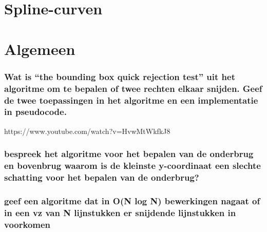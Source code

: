 \documentclass[12pt,a4paper]{article}
\begin{document}
\part{Spline-curven}
\iffalse
\section{Bewijs de eenheidspartitieeigenschap van genormaliseerde B-splines.}
\section{Hoe kan men bij splinecurven punten laten interpoleren door het samennemen van controlepunten? Hoeveel moeten er samenvallen? }
\section{Hoe kan men bij splines punten laten interpoleren door het samennemen van knooppunten?}
\section{Geef het algoritm van de Boor en bewijs de correctheid ervan.}
\section{Hoe kan je ervoor zorgen dat een deel van een spline curve een recht lijnstuk is?}
\fi

\part{Algemeen}
\iffalse
\section{Wat is ``the bounding box quick rejection test'' uit het algoritme om te bepalen of twee rechten elkaar snijden. Geef de twee toepassingen in het algoritme en een implementatie in pseudocode.}https://www.youtube.com/watch?v=HvwMtWkfkJ8 
\section{bespreek het algoritme voor het bepalen van de onderbrug en bovenbrug waarom is de kleinste y-coordinaat een slechte schatting voor het bepalen van de onderbrug?}
\section{geef een algoritme dat in O(N log N) bewerkingen nagaat of in een vz van N lijnstukken er snijdende lijnstukken in voorkomen}
\end{document}
